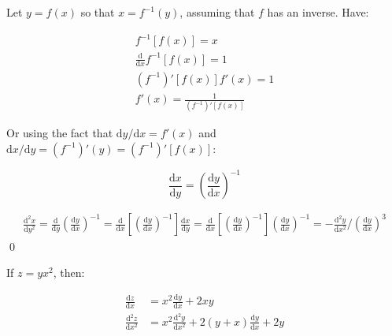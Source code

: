 \documentclass[12pt]{article}
\begin{document}

Let $y = f(x)$ so that $x = f^{-1}(y)$, assuming that $f$ has an inverse. Have:

\begin{equation}
    \begin{split}
        f^{-1}[f(x)] = x \\
        \frac{\mathrm{d}}{\mathrm{d}x} f^{-1}[f(x)] = 1 \\
        (f^{-1})'[f(x)] f'(x) = 1 \\
        f'(x) = \frac{1}{(f^{-1})'[f(x)]}
    \end{split}
\end{equation}

Or using the fact that $\mathrm{d}y/\mathrm{d}x = f'(x)$ and $\mathrm{d}x/\mathrm{d}y = (f^{-1})'(y) = (f^{-1})'[f(x)]$:

\begin{equation}
    \frac{\mathrm{d}x}{\mathrm{d}y} = \left( \frac{\mathrm{d}y}{\mathrm{d}x} \right)^{-1}
\end{equation}


\begin{equation}
    \begin{split}
        \frac{\mathrm{d}^{2}x}{\mathrm{d}y^{2}} = \frac{\mathrm{d}}{\mathrm{d}y} \left( \frac{\mathrm{d}y}{\mathrm{d}x} \right)^{-1} = \frac{\mathrm{d}}{\mathrm{d}x} \left[ \left( \frac{\mathrm{d}y}{\mathrm{d}x} \right)^{-1} \right] \frac{\mathrm{d}x}{\mathrm{d}y} = \frac{\mathrm{d}}{\mathrm{d}x} \left[ \left( \frac{\mathrm{d}y}{\mathrm{d}x} \right)^{-1} \right] \left( \frac{\mathrm{d}y}{\mathrm{d}x} \right)^{-1} = - \frac{\mathrm{d}^{2}y}{\mathrm{d}x^{2}}/\left( \frac{\mathrm{d}y}{\mathrm{d}x} \right)^{3}
    \end{split}
\end{equation}
\qed



If $z = y x^{2}$, then:

\begin{equation}
    \begin{split}
        \frac{\mathrm{d}z}{\mathrm{d}x} &= x^{2} \frac{\mathrm{d}y}{\mathrm{d}x} + 2xy \\
        \frac{\mathrm{d}^{2}z}{\mathrm{d}x^{2}} &= x^{2} \frac{\mathrm{d}^{2}y}{\mathrm{d}x^{2}} + 2(y + x) \frac{\mathrm{d}y}{\mathrm{d}x} + 2y
    \end{split}
\end{equation}
\end{document}
